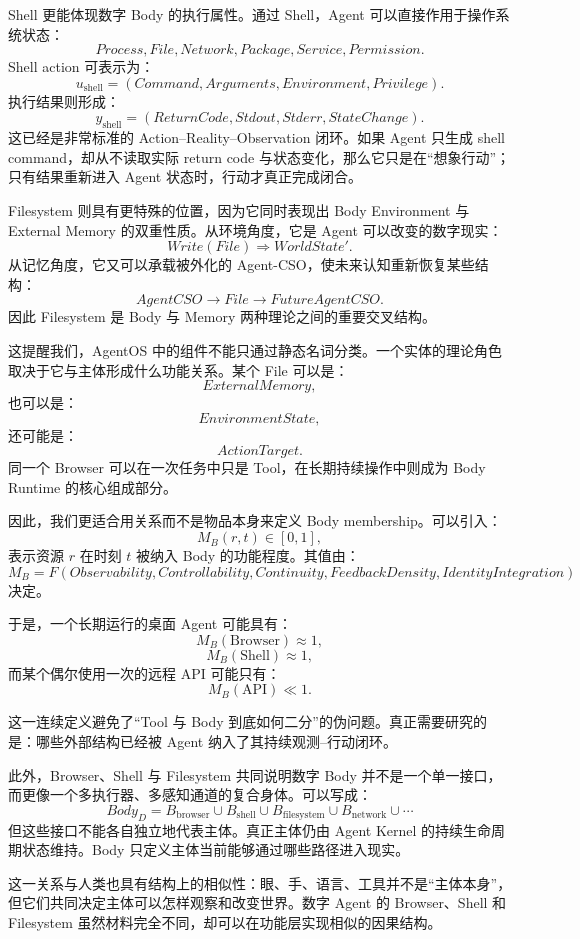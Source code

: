Shell 更能体现数字 Body 的执行属性。通过 Shell，Agent 可以直接作用于操作系统状态：
\[
Process,
File,
Network,
Package,
Service,
Permission.
\]
Shell action 可表示为：
\[
u_{\mathrm{shell}}
=
(Command,Arguments,Environment,Privilege).
\]
执行结果则形成：
\[
y_{\mathrm{shell}}
=
(ReturnCode,Stdout,Stderr,StateChange).
\]
这已经是非常标准的 Action--Reality--Observation 闭环。如果 Agent 只生成 shell command，却从不读取实际 return code 与状态变化，那么它只是在“想象行动”；只有结果重新进入 Agent 状态时，行动才真正完成闭合。

Filesystem 则具有更特殊的位置，因为它同时表现出 Body Environment 与 External Memory 的双重性质。从环境角度，它是 Agent 可以改变的数字现实：
\[
Write(File)
\Rightarrow
WorldState'.
\]
从记忆角度，它又可以承载被外化的 Agent-CSO，使未来认知重新恢复某些结构：
\[
AgentCSO
\rightarrow
File
\rightarrow
FutureAgentCSO.
\]
因此 Filesystem 是 Body 与 Memory 两种理论之间的重要交叉结构。

这提醒我们，AgentOS 中的组件不能只通过静态名词分类。一个实体的理论角色取决于它与主体形成什么功能关系。某个 File 可以是：
\[
ExternalMemory,
\]
也可以是：
\[
EnvironmentState,
\]
还可能是：
\[
ActionTarget.
\]
同一个 Browser 可以在一次任务中只是 Tool，在长期持续操作中则成为 Body Runtime 的核心组成部分。

因此，我们更适合用关系而不是物品本身来定义 Body membership。可以引入：
\[
M_B(r,t)
\in
[0,1],
\]
表示资源 $r$ 在时刻 $t$ 被纳入 Body 的功能程度。其值由：
\[
M_B
=
F(
Observability,
Controllability,
Continuity,
FeedbackDensity,
IdentityIntegration
)
\]
决定。

于是，一个长期运行的桌面 Agent 可能具有：
\[
M_B(\mathrm{Browser})\approx1,
\]
\[
M_B(\mathrm{Shell})\approx1,
\]
而某个偶尔使用一次的远程 API 可能只有：
\[
M_B(\mathrm{API})\ll1.
\]

这一连续定义避免了“Tool 与 Body 到底如何二分”的伪问题。真正需要研究的是：哪些外部结构已经被 Agent 纳入了其持续观测--行动闭环。

此外，Browser、Shell 与 Filesystem 共同说明数字 Body 并不是一个单一接口，而更像一个多执行器、多感知通道的复合身体。可以写成：
\[
Body_D
=
B_{\mathrm{browser}}
\cup
B_{\mathrm{shell}}
\cup
B_{\mathrm{filesystem}}
\cup
B_{\mathrm{network}}
\cup
\cdots
\]
但这些接口不能各自独立地代表主体。真正主体仍由 Agent Kernel 的持续生命周期状态维持。Body 只定义主体当前能够通过哪些路径进入现实。

这一关系与人类也具有结构上的相似性：眼、手、语言、工具并不是“主体本身”，但它们共同决定主体可以怎样观察和改变世界。数字 Agent 的 Browser、Shell 和 Filesystem 虽然材料完全不同，却可以在功能层实现相似的因果结构。

